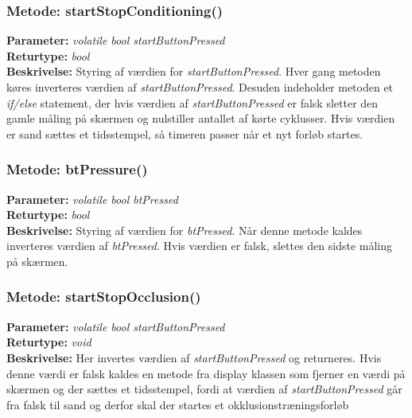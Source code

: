 \subsubsection{Metode: startStopConditioning()}
\textbf{Parameter: } \textit{volatile bool startButtonPressed}
\\ \textbf{Returtype: } \textit{bool}
\\ \textbf{Beskrivelse: } Styring af værdien for \textit{startButtonPressed}. Hver gang metoden køres inverteres værdien af \textit{startButtonPressed}. Desuden indeholder metoden et \textit{if/else} statement, der hvis værdien af \textit{startButtonPressed} er falsk sletter den gamle måling på skærmen og nulstiller antallet af kørte cyklusser. Hvis værdien er sand sættes et tidsstempel, så timeren passer når et nyt forløb startes.  

\subsubsection{Metode: btPressure()}
\textbf{Parameter: } \textit{volatile bool btPressed}
\\ \textbf{Returtype: } \textit{bool}
\\ \textbf{Beskrivelse: } Styring af værdien for \textit{btPressed}. Når denne metode kaldes inverteres værdien af \textit{btPressed}. Hvis værdien er falsk, slettes den sidste måling på skærmen.

\subsubsection{Metode: startStopOcclusion()}
\textbf{Parameter: } \textit{volatile bool startButtonPressed}
\\ \textbf{Returtype: } \textit{void}
\\ \textbf{Beskrivelse: } Her invertes værdien af \textit{startButtonPressed} og returneres. Hvis denne værdi er falsk kaldes en metode fra display klassen som fjerner en værdi på skærmen og der sættes et tidsstempel, fordi at værdien af \textit{startButtonPressed} går fra falsk til sand og derfor skal der startes et okklusionstræningsforløb 

